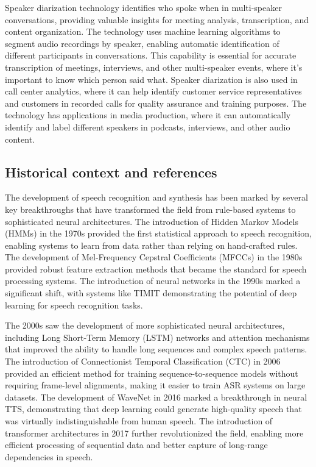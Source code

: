Speaker diarization technology identifies who spoke when in multi-speaker conversations, providing valuable insights for meeting analysis, transcription, and content organization. The technology uses machine learning algorithms to segment audio recordings by speaker, enabling automatic identification of different participants in conversations. This capability is essential for accurate transcription of meetings, interviews, and other multi-speaker events, where it's important to know which person said what. Speaker diarization is also used in call center analytics, where it can help identify customer service representatives and customers in recorded calls for quality assurance and training purposes. The technology has applications in media production, where it can automatically identify and label different speakers in podcasts, interviews, and other audio content.

\subsection{Historical context and references}

The development of speech recognition and synthesis has been marked by several key breakthroughs that have transformed the field from rule-based systems to sophisticated neural architectures. The introduction of Hidden Markov Models (HMMs) in the 1970s provided the first statistical approach to speech recognition, enabling systems to learn from data rather than relying on hand-crafted rules. The development of Mel-Frequency Cepstral Coefficients (MFCCs) in the 1980s provided robust feature extraction methods that became the standard for speech processing systems. The introduction of neural networks in the 1990s marked a significant shift, with systems like TIMIT demonstrating the potential of deep learning for speech recognition tasks.

The 2000s saw the development of more sophisticated neural architectures, including Long Short-Term Memory (LSTM) networks and attention mechanisms that improved the ability to handle long sequences and complex speech patterns. The introduction of Connectionist Temporal Classification (CTC) in 2006 provided an efficient method for training sequence-to-sequence models without requiring frame-level alignments, making it easier to train ASR systems on large datasets. The development of WaveNet in 2016 marked a breakthrough in neural TTS, demonstrating that deep learning could generate high-quality speech that was virtually indistinguishable from human speech. The introduction of transformer architectures in 2017 further revolutionized the field, enabling more efficient processing of sequential data and better capture of long-range dependencies in speech.

